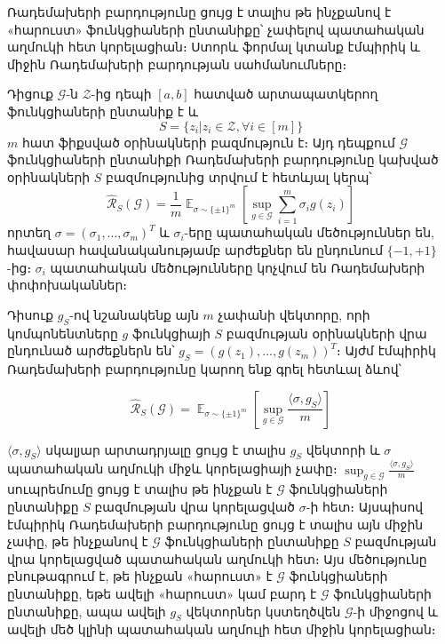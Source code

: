 \documentclass[12pt]{article}
\DeclareMathOperator*{\E}{\mathbb{E}}
\begin{document}
Ռադեմախերի բարդությունը ցույց է տալիս թե ինչքանով է «հարուստ» ֆունկցիաների ընտանիքը՝ չափելով պատահական աղմուկի հետ կորելացիան։ Ստորև  ֆորմալ կտանք  էմպիրիկ և միջին Ռադեմախերի բարդության սահմանումները։

\begin{defination}
Դիցուք $\mathcal{G}$-ն $\mathcal{Z}$-ից դեպի $[a, b]$ հատված արտապատկերող ֆունկցիաների ընտանիք է և
$$S = \{z_i  | z_i \in \mathcal{Z}, \forall i \in [m]\}$$
$m$ հատ ֆիքսված օրինակների բազմություն է։ Այդ դեպքում $\mathcal{G}$ ֆունկցիաների ընտանիքի Ռադեմախերի բարդությունը կախված օրինակների $S$ բազմությունից տրվում է հետևյալ կերպ՝
$$\hat{\mathcal{R}}_S(\mathcal{G})  = \frac{1}{m}\E_{\sigma \sim \{\pm1\}^m} \left [\sup_{g \in \mathcal{G}} \sum_{i=1}^m \sigma_ig(z_i) \right] $$
որտեղ $\sigma = (\sigma_1, ..., \sigma_m)^T$ և $\sigma_i$-երը պատահական մեծություններ են, հավասար հավանականությամբ արժեքներ են ընդունում $\{-1, +1\}$-ից։ $\sigma_i$ պատահական մեծությունները կոչվում են Ռադեմախերի փոփոխականներ։
\end{defination}

Դիսուք $g_S$-ով նշանակենք այն $m$ չափանի վեկտորը, որի կոմպոնենտները $g$ ֆունկցիայի $S$ բազմության օրինակների վրա ընդունած արժեքներն են՝ $g_S = (g(z_1), ..., g(z_m))^T$։ Այժմ էմպիրիկ Ռադեմախերի բարդությունը կարող ենք գրել հետևալ ձևով՝

$$\hat{\mathcal{R}}_S(\mathcal{G})  = \E  _{\sigma \sim \{ \pm 1\}^m}  \left [  \sup_{g \in \mathcal{G}} \frac{\langle \sigma, g_S \rangle }{m} \right ]$$

$\langle \sigma, g_S \rangle$ սկալյար արտադրյալը ցույց է տալիս $g_S$ վեկտորի և $\sigma$ պատահական աղմուկի միջև կորելացիայի չափը։ $\sup_{g \in \mathcal{G}}  \frac{\langle \sigma, g_S \rangle}{m}$ սուպրեմումը ցույց է տալիս թե ինչքան է $\mathcal{G}$ ֆունկցիաների ընտանիքը $S$ բազմության վրա կորելացված $\sigma$-ի հետ։ Այսպիսով էմպիրիկ Ռադեմախերի բարդությունը ցույց է տալիս այն միջին չափը, թե ինչքանով է $\mathcal{G}$ ֆունկցիաների ընտանիքը $S$ բազմության վրա կորելացված պատահական աղմուկի հետ։ Այս մեծությունը բնութագրում է, թե ինչքան «հարուստ» է $\mathcal{G}$ ֆունկցիաների ընտանիքը, եթե ավելի «հարուստ» կամ բարդ է $\mathcal{G}$ ֆունկցիաների ընտանիքը, ապա ավելի $g_S$ վեկտորներ կստեղծվեն $\mathcal{G}$-ի միջոցով և ավելի մեծ կլինի պատահական աղմուլի հետ միջին կորելացիան։
\end{document}
